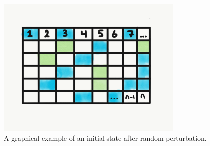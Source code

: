 \begin{figure}
    \centering
    \includegraphics[width=0.8\textwidth]{img/perturbed_initial_state}
 	\captionsetup{singlelinecheck=off,justification=raggedright}
  	\caption{A graphical example of an initial state after random perturbation.}
    \label{fig:perturbed_initial_state}
\end{figure}